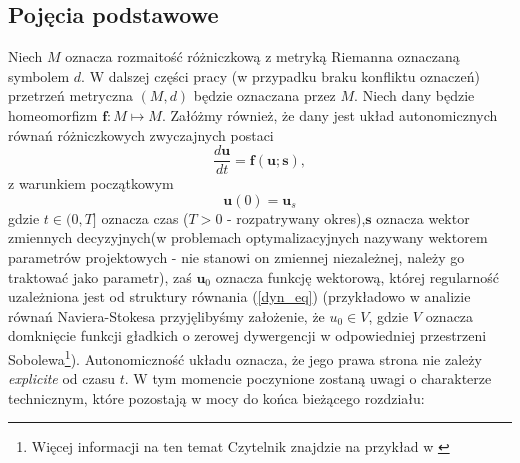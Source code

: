 \documentclass[12pt]{article}
\begin{document}
\subsection{Pojęcia podstawowe}
Niech $ M $ oznacza rozmaitość różniczkową z metryką Riemanna oznaczaną symbolem $ d $. W dalszej części pracy (w przypadku braku konfliktu oznaczeń) przetrzeń metryczna $ (M,d) $ będzie oznaczana przez $ M $. Niech dany będzie homeomorfizm $  \textbf{f}: M \mapsto M$.
Załóżmy również, że dany jest układ autonomicznych równań różniczkowych zwyczajnych postaci
\begin{equation}
\frac{d\textbf{u}}{dt} =  \textbf{f}(\textbf{u};\textbf{s}),
\label{dyn_eq}
\end{equation}
z warunkiem początkowym
\begin{equation}
\textbf{u}(0) = \textbf{u}_{s}
\label{U1}
\end{equation}
gdzie $t\in(0,T]$ oznacza czas ($ T>0 $ - rozpatrywany okres),$ \textbf{s} $ oznacza wektor zmiennych decyzyjnych(w problemach optymalizacyjnych nazywany wektorem parametrów projektowych  - nie stanowi on zmiennej niezależnej, należy go traktować jako parametr), zaś $ \textbf{u}_{0} $ oznacza funkcję wektorową, której regularność uzależniona jest od struktury równania (\ref{dyn_eq}) (przykładowo w analizie równań Naviera-Stokesa przyjęlibyśmy założenie, że $ u_{0}\in V $, gdzie $ V $ oznacza domknięcie funkcji gładkich o zerowej dywergencji w odpowiedniej przestrzeni Sobolewa\footnote{Więcej informacji na ten temat Czytelnik znajdzie na przykład w \cite{Teman}}). Autonomiczność układu oznacza, że jego prawa strona nie zależy \textit{explicite} od czasu $ t $.\newline
W tym momencie poczynione zostaną uwagi o charakterze technicznym, które pozostają w mocy do końca bieżącego rozdziału:
\end{document}
